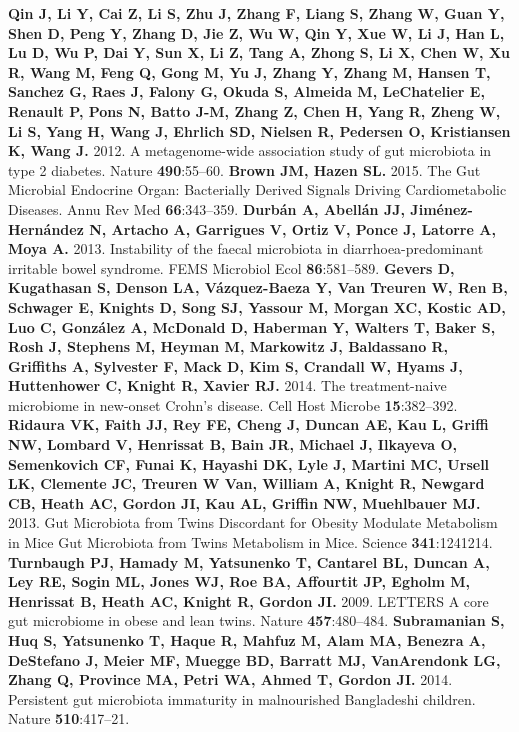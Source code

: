 \documentclass[12pt,oneside,letterpaper]{article}
\begin{document}
\newpage
\begin{thebibliography}{99}
 {\bf Qin J, Li Y, Cai Z, Li S, Zhu J, Zhang F, Liang S, Zhang W, Guan Y, Shen D, Peng Y, Zhang D, Jie Z, Wu W, Qin Y, Xue W, Li J, Han L, Lu D, Wu P, Dai Y, Sun X, Li Z, Tang A, Zhong S, Li X, Chen W, Xu R, Wang M, Feng Q, Gong M, Yu J, Zhang Y, Zhang M, Hansen T, Sanchez G, Raes J, Falony G, Okuda S, Almeida M, LeChatelier E, Renault P, Pons N, Batto J-M, Zhang Z, Chen H, Yang R, Zheng W, Li S, Yang H, Wang J, Ehrlich SD, Nielsen R, Pedersen O, Kristiansen K, Wang J.} 2012. A metagenome-wide association study of gut microbiota in type 2 diabetes. Nature {\bf 490}:55–60.
 {\bf Brown JM, Hazen SL.} 2015. The Gut Microbial Endocrine Organ: Bacterially Derived Signals Driving Cardiometabolic Diseases. Annu Rev Med {\bf 66}:343–359.
 {\bf Durbán A, Abellán JJ, Jiménez-Hernández N, Artacho A, Garrigues V, Ortiz V, Ponce J, Latorre A, Moya A.} 2013. Instability of the faecal microbiota in diarrhoea-predominant irritable bowel syndrome. FEMS Microbiol Ecol {\bf 86}:581–589.
 {\bf Gevers D, Kugathasan S, Denson LA, Vázquez-Baeza Y, Van Treuren W, Ren B, Schwager E, Knights D, Song SJ, Yassour M, Morgan XC, Kostic AD, Luo C, González A, McDonald D, Haberman Y, Walters T, Baker S, Rosh J, Stephens M, Heyman M, Markowitz J, Baldassano R, Griffiths A, Sylvester F, Mack D, Kim S, Crandall W, Hyams J, Huttenhower C, Knight R, Xavier RJ.} 2014. The treatment-naive microbiome in new-onset Crohn’s disease. Cell Host Microbe {\bf 15}:382–392.
 {\bf Ridaura VK, Faith JJ, Rey FE, Cheng J, Duncan AE, Kau L, Griffi NW, Lombard V, Henrissat B, Bain JR, Michael J, Ilkayeva O, Semenkovich CF, Funai K, Hayashi DK, Lyle J, Martini MC, Ursell LK, Clemente JC, Treuren W Van, William A, Knight R, Newgard CB, Heath AC, Gordon JI, Kau AL, Griffin NW, Muehlbauer MJ.} 2013. Gut Microbiota from Twins Discordant for Obesity Modulate Metabolism in Mice Gut Microbiota from Twins Metabolism in Mice. Science {\bf 341}:1241214.
 {\bf Turnbaugh PJ, Hamady M, Yatsunenko T, Cantarel BL, Duncan A, Ley RE, Sogin ML, Jones WJ, Roe BA, Affourtit JP, Egholm M, Henrissat B, Heath AC, Knight R, Gordon JI.} 2009. LETTERS A core gut microbiome in obese and lean twins. Nature {\bf 457}:480–484.
 {\bf Subramanian S, Huq S, Yatsunenko T, Haque R, Mahfuz M, Alam MA, Benezra A, DeStefano J, Meier MF, Muegge BD, Barratt MJ, VanArendonk LG, Zhang Q, Province MA, Petri WA, Ahmed T, Gordon JI.} 2014. Persistent gut microbiota immaturity in malnourished Bangladeshi children. Nature {\bf 510}:417–21.

\end{thebibliography}
\end{document}
